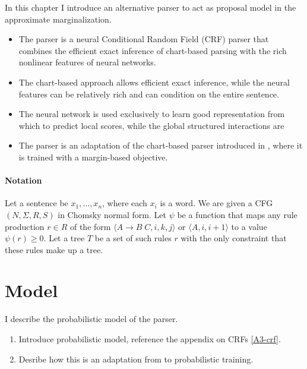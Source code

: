 % 

In this chapter I introduce an alternative parser to act as proposal model in the approximate marginalization.

\begin{itemize}
  \item The parser is a neural Conditional Random Field (CRF) parser that combines the efficient exact inference of chart-based parsing with the rich nonlinear features of neural networks.
  \item The chart-based approach allows efficient exact inference, while the neural features can be relatively rich and can condition on the entire sentence.
  \item The neural network is used exclusively to learn good representation from which to predict local scores, while the global structured interactions are
  \item The parser is an adaptation of the chart-based parser introduced in \citet{stern2017minimal}, where it is trained with a margin-based objective.
\end{itemize}

\paragraph{Notation}
Let a sentence be $x_1,\dots,x_n$, where each $x_i$
is a word. We are given a CFG $(N, \Sigma, R, S)$ in Chomsky normal
form. Let $\psi$ be a function that maps any rule production $r \in R$ of the form $\langle A \to B \;C, i, k, j \rangle$ or $\langle A, i, i+1 \rangle$ to a value $\psi(r) \geq 0$. Let a tree $T$ be a set of such rules $r$ with the only constraint that these rules make up a tree.


\section{Model}
I describe the probabilistic model of the parser.
\begin{enumerate}
  \item Introduce probabilistic model, reference the appendix on CRFs \ref{A3-crf}.
  \item Desribe how this is an adaptation from \citet{stern2017minimal} to probabilistic training.
\end{enumerate}

